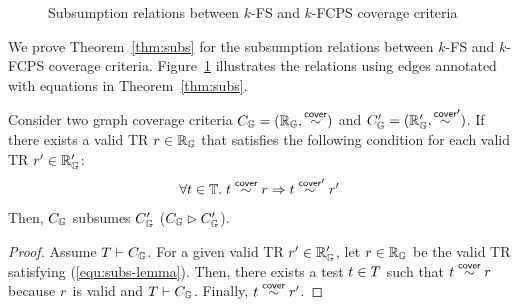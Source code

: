 
\begin{figure}
  \centering
\scriptsize
\vspace*{-1em}
  \caption{
    Subsumption relations between $k$-FS and $k$-FCPS coverage criteria
  }
\vspace*{-1em}
  \label{fig:subs}
\end{figure}

We prove Theorem~\ref{thm:subs} for the subsumption relations
between $k$-FS and $k$-FCPS coverage criteria.
Figure~\ref{fig:subs} illustrates the relations using edges
annotated with equations in Theorem~\ref{thm:subs}.


\begin{lemma}\label{lem:subs}
  Consider two graph coverage criteria $C_{\mathbb{G}} = (\mathbb{R}_{\mathbb{G}}, \overset{\textsf{cover}}{\sim})$
  and $C_{\mathbb{G}}' = (\mathbb{R}_{\mathbb{G}}', \overset{\textsf{cover}}{\sim}')$.
  If there exists a valid TR $r \in \mathbb{R}_{\mathbb{G}}$ that satisfies the following
  condition for each valid TR $r' \in \mathbb{R}_{\mathbb{G}}'$:
  \begin{equation}\label{equ:subs-lemma}
    \forall t \in \mathbb{T}. \; t \overset{\textsf{cover}}{\sim} r \Rightarrow t \overset{\textsf{cover}}{\sim}' r'
  \end{equation}
  Then, $C_{\mathbb{G}}$ subsumes $C_{\mathbb{G}}'$ ($C_{\mathbb{G}}
  \rhd C_{\mathbb{G}}'$).
\end{lemma}
\begin{proof}
  Assume $T \vdash C_{\mathbb{G}}$.
  For a given valid TR $r' \in \mathbb{R}_{\mathbb{G}}'$, let $r \in \mathbb{R}_{\mathbb{G}}$
  be the valid TR satisfying (\ref{equ:subs-lemma}).
  Then, there exists a test $t \in T$ such that $t \overset{\textsf{cover}}{\sim} r$ because
  $r$ is valid and $T \vdash C_{\mathbb{G}}$.
  Finally, $t \overset{\textsf{cover}}{\sim} r'$.
\end{proof}

